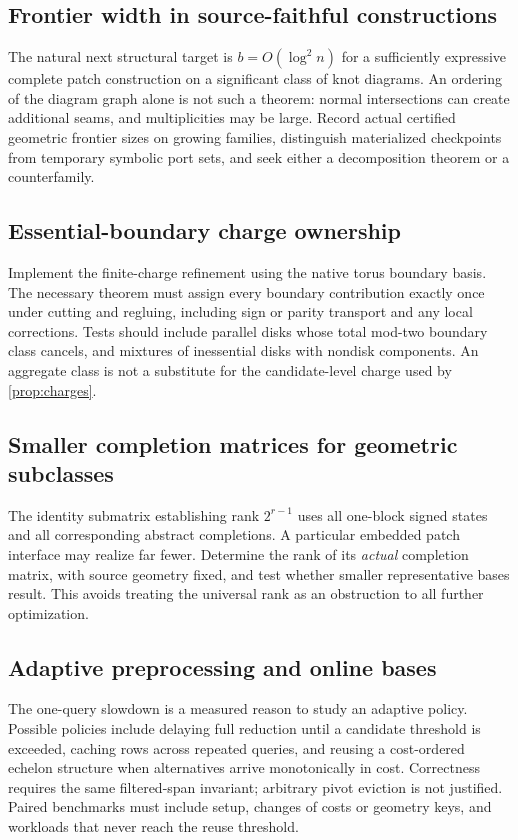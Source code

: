 \documentclass[11pt,letterpaper]{article}
\theoremstyle{definition}
\begin{document}
\subsection{Frontier width in source-faithful constructions}
The natural next structural target is $b=O(\log^2 n)$ for a sufficiently expressive complete patch construction on a significant class of knot diagrams. An ordering of the diagram graph alone is not such a theorem: normal intersections can create additional seams, and multiplicities may be large. Record actual certified geometric frontier sizes on growing families, distinguish materialized checkpoints from temporary symbolic port sets, and seek either a decomposition theorem or a counterfamily.

\subsection{Essential-boundary charge ownership}
Implement the finite-charge refinement using the native torus boundary basis. The necessary theorem must assign every boundary contribution exactly once under cutting and regluing, including sign or parity transport and any local corrections. Tests should include parallel disks whose total mod-two boundary class cancels, and mixtures of inessential disks with nondisk components. An aggregate class is not a substitute for the candidate-level charge used by \cref{prop:charges}.

\subsection{Smaller completion matrices for geometric subclasses}
The identity submatrix establishing rank $2^{r-1}$ uses all one-block signed states and all corresponding abstract completions. A particular embedded patch interface may realize far fewer. Determine the rank of its \emph{actual} completion matrix, with source geometry fixed, and test whether smaller representative bases result. This avoids treating the universal rank as an obstruction to all further optimization.

\subsection{Adaptive preprocessing and online bases}
The one-query slowdown is a measured reason to study an adaptive policy. Possible policies include delaying full reduction until a candidate threshold is exceeded, caching rows across repeated queries, and reusing a cost-ordered echelon structure when alternatives arrive monotonically in cost. Correctness requires the same filtered-span invariant; arbitrary pivot eviction is not justified. Paired benchmarks must include setup, changes of costs or geometry keys, and workloads that never reach the reuse threshold.
\end{document}
